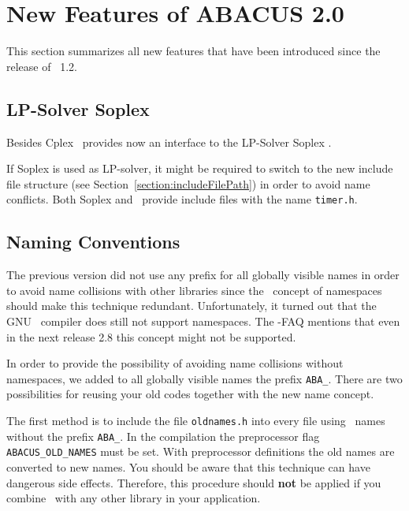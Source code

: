 \section{New Features of ABACUS 2.0}
\label{section:new20}

This section summarizes all new features that have been introduced
since the release of \ABACUS\ 1.2. 

\subsection{LP-Solver Soplex}

Besides Cplex \ABACUS\ provides now an interface to the LP-Solver
Soplex \cite{Wun97}.

If Soplex is used as LP-solver, it might be
required to switch to the
new include file structure (see
Section~\ref{section:includeFilePath}) in order to avoid name
conflicts. Both Soplex and \ABACUS\ provide include files with the
name \texttt{timer.h}.

\subsection{Naming Conventions}
\label{section:namingConventions}

The previous version did not use any prefix for all globally visible
names in order to avoid name collisions with other libraries since the
\CPLUSPLUS\ concept of namespaces should make this technique
redundant. Unfortunately, it turned out that the GNU \CPLUSPLUS\
compiler does still not support namespaces. The \GPLUSPLUS-FAQ
mentions that even in the next release 2.8 this concept might not be
supported.

In order to provide the possibility of
avoiding name collisions without namespaces,
we added to all globally visible names the prefix \texttt{ABA\_}.
There are two possibilities for reusing your old codes together with
the new name concept. 

The first method is to include the file {\tt oldnames.h} into every
file using \ABACUS\ names without the prefix {\tt ABA\_}. 
In the compilation the preprocessor flag 
{\tt ABACUS\_OLD\_NAMES}
must be set. With
preprocessor definitions the old names are converted to new names. 
You should be aware that this technique can have dangerous side
effects. Therefore, this procedure should {\bf not} be applied if you combine
\ABACUS\ with any other library in your application.

